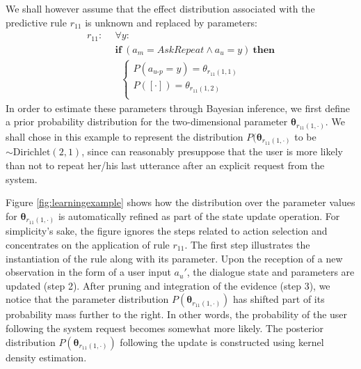 We shall however assume that the effect distribution associated with the predictive rule $r_{11}$ is unknown and replaced by parameters: 
\begin{align*}
r_{11}: \ \ & \forall y: \\ 
& \textbf{if} \ (a_m = \mathit{AskRepeat} \land a_u=y) \ \textbf{then} \\ 
& \; \;  \begin{cases} 
P(a_{u\mbox{-}p} = y) = \theta_{r_{11}(1,1)} \\ 
P([\cdot]) = \theta_{r_{11}(1,2)} \\ 
\end{cases}
\end{align*}
In order to estimate these parameters through Bayesian inference, we first define a prior probability distribution for the two-dimensional parameter $\boldsymbol\theta_{r_{11}(1,\cdot)}$.  We shall chose in this example to represent the distribution $P(\boldsymbol\theta_{r_{11}(1,\cdot)}$ to be $\sim \mathrm{Dirichlet}(2,1)$, since can reasonably presuppose that the user is more likely than not to repeat her/his last utterance after an explicit request from the system.

Figure \ref{fig:learningexample} shows how the distribution over the parameter values for $\boldsymbol\theta_{r_{11}(1,\cdot)}$ is automatically refined as part of the state update operation.  For simplicity's sake, the figure ignores the steps related to action selection and concentrates on the application of rule $r_{11}$.  The first step illustrates the instantiation of the rule along with its parameter. Upon the reception of a new observation in the form of a user input $a_u'$, the dialogue state and parameters are updated (step 2). After pruning and integration of the evidence (step 3), we notice that the parameter distribution $P(\boldsymbol\theta_{r_{11}(1,\cdot)})$ has shifted part of its probability mass further to the right. In other words, the probability of the user following the system request becomes somewhat more likely. The posterior distribution $P(\boldsymbol\theta_{r_{11}(1,\cdot)})$ following the update is constructed using kernel density estimation. 

